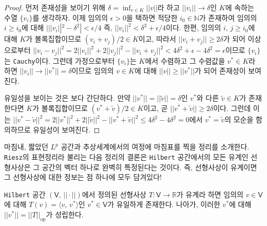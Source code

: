 \begin{proof}
    먼저 존재성을 보이기 위해 $\delta=\inf_{v\in K}||v||$라 하고 $||v_i||\to\delta$인 $K$에 속하는 수열 $\{v_i\}$를 생각하자. 이제 임의의 $\epsilon>0$을 택하면 적당한 $i_0\in\mathbb{N}$가 존재하여 임의의 $i\geq i_0$에 대해 $|||v_i||^2-\delta^2|<\epsilon/4$ 즉, $||v_i||^2<\delta^2+\epsilon/4$이다. 한편, 임의의 $i,\,j\geq i_0$에 대해 $K$가 볼록집합이므로 $(v_i+v_j)/2\in K$이고, 따라서 $||v_i+v_j||\geq2\delta$가 되어 이상으로부터 $||v_i-v_j||^2=2||v_i||^2+2||v_j||^2-||v_i+v_j||^2<4\delta^2+\epsilon-4\delta^2=\epsilon$이므로 $\{v_i\}$는 \texttt{Cauchy}이다. 그런데 가정으로부터 $\{v_i\}$는 $K$에서 수렴하고 그 수렴값을 $v^*\in K$라 하면 $||v_i||\to||v^*||=\delta$이므로 임의의 $v\in K$에 대해 $||v||\geq||v^*||$가 되어 존재성이 보여진다.

    유일성을 보이는 것은 보다 간단하다. 만약 $||v^*||=||\widetilde{v}||=\delta$인 $v^*$와 다른 $\widetilde{v}\in K$가 존재한다면 $K$가 볼록집합이므로 $(v^*+\widetilde{v})/2\in K$이고, 곧 $||v^*+\widetilde{v}||\geq2\delta$이다. 그런데 이는 $||v^*-\widetilde{v}||^2=2||v^*||^2+2||\widetilde{v}||^2-||v^*+\widetilde{v}||^2\leq4\delta^2-4\delta^2=0$에서 $v^*=\widetilde{v}$의 모순을 함의하므로 유일성이 보여진다.
\end{proof}

마침내, 짧았던 $L^p$ 공간과 추상세계에서의 여정에 마침표를 찍을 정리를 소개한다. \texttt{Riesz}의 표현정리라 불리는 다음 정리의 결론은 \texttt{Hilbert} 공간에서의 모든 유계인 선형사상은 그 공간의 벡터 하나로 완벽히 특정된다는 것이다. 즉, 선형사상이 유계이면 그 선형사상에 대한 정보는 점 하나에 모두 담겨있다!

\begin{theorem}
    \texttt{Hilbert} 공간 $(\mathsf{V},\,||\cdot||)$에서 정의된 선형사상 $T:\mathsf{V}\to\mathbb{R}$가 유계라 하면 임의의 $v\in\mathsf{V}$에 대해 $T(v)=\langle v,\,v^*\rangle$인 $v^*\in\mathsf{V}$가 유일하게 존재한다. 나아가, 이러한 $v^*$에 대해 $||v^*||=||T||_{\mathrm{op}}$가 성립한다.
\end{theorem}

